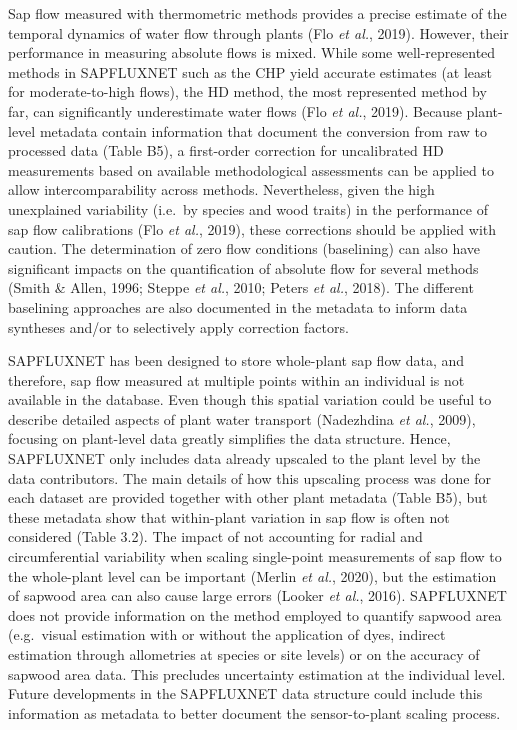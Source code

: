 \documentclass[11pt,twoside]{reedthesis}
\begin{document}
Sap flow measured with thermometric methods provides a precise estimate
of the temporal dynamics of water flow through plants (Flo \emph{et
al.}, 2019). However, their performance in measuring absolute flows is
mixed. While some well-represented methods in SAPFLUXNET such as the CHP
yield accurate estimates (at least for moderate-to-high flows), the HD
method, the most represented method by far, can significantly
underestimate water flows (Flo \emph{et al.}, 2019). Because plant-level
metadata contain information that document the conversion from raw to
processed data (Table B5), a first-order correction for uncalibrated HD
measurements based on available methodological assessments can be
applied to allow intercomparability across methods. Nevertheless, given
the high unexplained variability (i.e.~by species and wood traits) in
the performance of sap flow calibrations (Flo \emph{et al.}, 2019),
these corrections should be applied with caution. The determination of
zero flow conditions (baselining) can also have significant impacts on
the quantification of absolute flow for several methods (Smith \& Allen,
1996; Steppe \emph{et al.}, 2010; Peters \emph{et al.}, 2018). The
different baselining approaches are also documented in the metadata to
inform data syntheses and/or to selectively apply correction
factors.\par

SAPFLUXNET has been designed to store whole-plant sap flow data, and
therefore, sap flow measured at multiple points within an individual is
not available in the database. Even though this spatial variation could
be useful to describe detailed aspects of plant water transport
(Nadezhdina \emph{et al.}, 2009), focusing on plant-level data greatly
simplifies the data structure. Hence, SAPFLUXNET only includes data
already upscaled to the plant level by the data contributors. The main
details of how this upscaling process was done for each dataset are
provided together with other plant metadata (Table B5), but these
metadata show that within-plant variation in sap flow is often not
considered (Table 3.2). The impact of not accounting for radial and
circumferential variability when scaling single-point measurements of
sap flow to the whole-plant level can be important (Merlin \emph{et
al.}, 2020), but the estimation of sapwood area can also cause large
errors (Looker \emph{et al.}, 2016). SAPFLUXNET does not provide
information on the method employed to quantify sapwood area (e.g.~visual
estimation with or without the application of dyes, indirect estimation
through allometries at species or site levels) or on the accuracy of
sapwood area data. This precludes uncertainty estimation at the
individual level. Future developments in the SAPFLUXNET data structure
could include this information as metadata to better document the
sensor-to-plant scaling process.\par
\end{document}
